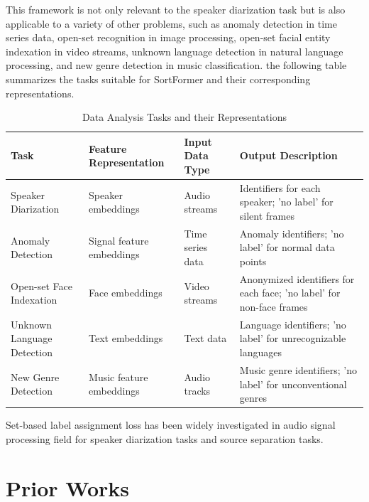 \documentclass{article}
\begin{document}
This framework is not only relevant to the speaker diarization task but is also applicable to a variety of other problems, such as
anomaly detection in time series data,
open-set recognition in image processing,
open-set facial entity indexation in video streams,
unknown language detection in natural language processing,
and new genre detection in music classification.
the following table summarizes the tasks suitable for SortFormer and their corresponding representations.

\begin{table}[h]
  \centering
  \renewcommand{\arraystretch}{1.5} %
  \begin{tabularx}{\textwidth}{p{3cm}|p{3cm}|p{2.5cm}|p{3cm}}
    \toprule
    \textbf{Task}              & \textbf{Feature Representation} & \textbf{Input Data Type} & \textbf{Output Description}                                          \\
    \hline
    Speaker Diarization        & Speaker embeddings              & Audio streams            & Identifiers for each speaker; 'no label' for silent frames           \\
    \hline
    Anomaly Detection          & Signal feature embeddings       & Time series data         & Anomaly identifiers; 'no label' for normal data points               \\
    \hline
    Open-set Face Indexation   & Face embeddings                 & Video streams            & Anonymized identifiers for each face; 'no label' for non-face frames \\
    \hline
    Unknown Language Detection & Text embeddings                 & Text data                & Language identifiers; 'no label' for unrecognizable languages        \\
    \hline
    New Genre Detection        & Music feature embeddings        & Audio tracks             & Music genre identifiers; 'no label' for unconventional genres        \\
    \bottomrule
  \end{tabularx}
  \vspace{1.5px}
  \caption{Data Analysis Tasks and their Representations}
  \label{tab:tasks}
\end{table}
Set-based label assignment loss has been widely investigated in audio signal processing field for speaker diarization tasks and source separation tasks. 


\section{Prior Works}
\end{document}
